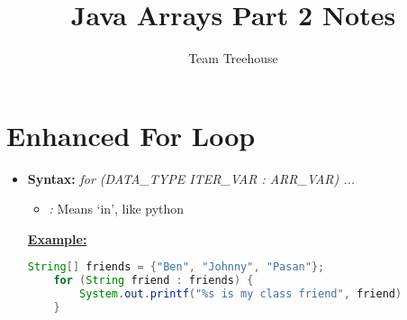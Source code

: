\documentclass[12pt]{article}
\begin{document}
\title{Java Arrays Part 2 Notes}
\author{Team Treehouse}
\maketitle

\section{Enhanced For Loop}

\bigskip

\begin{itemize}
    \item \textbf{Syntax:} \textit{for (DATA\_TYPE ITER\_VAR : ARR\_VAR) {...}}
    \begin{itemize}
        \item \textit{:} Means `in', like python
    \end{itemize}

    \bigskip

    \underline{\textbf{Example:}}

    \bigskip

    \begin{lstlisting}[language=Java]
    String[] friends = {"Ben", "Johnny", "Pasan"};
    for (String friend : friends) {
        System.out.printf("%s is my class friend", friend)
    }
    \end{lstlisting}
\end{itemize}
\end{document}
